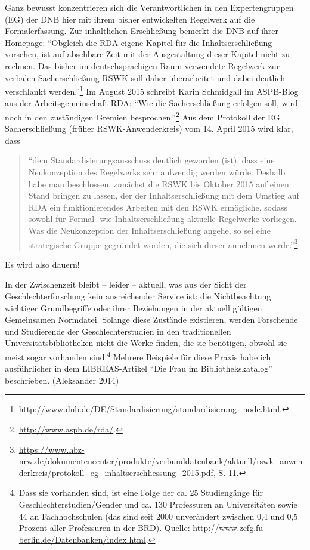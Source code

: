 Ganz bewusst konzentrieren sich die Verantwortlichen in den
Expertengruppen (EG) der DNB hier mit ihrem bisher entwickelten
Regelwerk auf die Formalerfassung. Zur inhaltlichen Erschließung bemerkt
die DNB auf ihrer Homepage: \enquote{Obgleich die RDA eigene Kapitel für
die Inhaltserschließung vorsehen, ist auf absehbare Zeit mit der
Ausgestaltung dieser Kapitel nicht zu rechnen. Das bisher im
deutschsprachigen Raum verwendete Regelwerk zur verbalen
Sacherschließung RSWK soll daher überarbeitet und dabei deutlich
verschlankt werden.}\footnote{\url{http://www.dnb.de/DE/Standardisierung/standardisierung_node.html}.}
Im August 2015 schreibt Karin Schmidgall im ASPB-Blog aus der
Arbeitsgemeinschaft RDA: \enquote{Wie die Sacherschließung erfolgen
soll, wird noch in den zuständigen Gremien besprochen.}\footnote{\url{http://www.aspb.de/rda/}.}
Aus dem Protokoll der EG Sacherschließung (früher RSWK-Anwenderkreis)
vom 14. April 2015 wird klar, dass

\begin{quote}
\enquote{dem Standardisierungsausschuss deutlich geworden (ist), dass
eine Neukonzeption des Regelwerks sehr aufwendig werden würde. Deshalb
habe man beschlossen, zunächst die RSWK bis Oktober 2015 auf einen Stand
bringen zu lassen, der der Inhaltserschließung mit dem Umstieg auf RDA
ein funktionierendes Arbeiten mit den RSWK ermögliche, sodass sowohl für
Formal- wie Inhaltserschließung aktuelle Regelwerke vorliegen. Was die
Neukonzeption der Inhaltserschließung angehe, so sei eine strategische
Gruppe gegründet worden, die sich dieser annehmen werde.}\footnote{\url{https://www.hbz-nrw.de/dokumentencenter/produkte/verbunddatenbank/aktuell/rswk_anwenderkreis/protokoll_eg_inhaltserschliessung_2015.pdf},
  S. 11.}
\end{quote}

Es wird also dauern!

In der Zwischenzeit bleibt -- leider -- aktuell, was aus der Sicht der
Geschlechterforschung kein ausreichender Service ist: die Nichtbeachtung
wichtiger Grundbegriffe oder ihrer Beziehungen in der aktuell gültigen
Gemeinsamen Normdatei. Solange diese Zustände existieren, werden
Forschende und Studierende der Geschlechterstudien in den traditionellen
Universitätsbibliotheken nicht die Werke finden, die sie benötigen,
obwohl sie meist sogar vorhanden sind.\footnote{Dass sie vorhanden sind,
  ist eine Folge der ca. 25 Studiengänge für Geschlechterstudien/Gender
  und ca. 130 Professuren an Universitäten sowie 44 an Fachhochschulen
  (das sind seit 2000 unverändert zwischen 0,4 und 0,5 Prozent aller
  Professuren in der BRD). Quelle:
  \url{http://www.zefg.fu-berlin.de/Datenbanken/index.html}.} Mehrere
Beispiele für diese Praxis habe ich ausführlicher in dem LIBREAS-Artikel
\enquote{Die Frau im Bibliothekskatalog} beschrieben. (Aleksander
2014)

